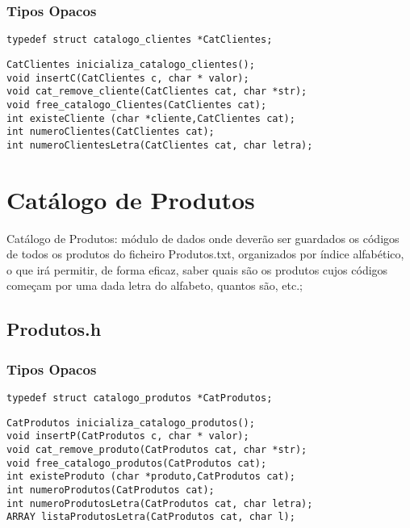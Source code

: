 \subsection{Tipos Opacos}

\begin{Verbatim}
typedef struct catalogo_clientes *CatClientes;
\end{Verbatim}


\begin{Verbatim}
CatClientes inicializa_catalogo_clientes();
void insertC(CatClientes c, char * valor);
void cat_remove_cliente(CatClientes cat, char *str);
void free_catalogo_Clientes(CatClientes cat);
int existeCliente (char *cliente,CatClientes cat);
int numeroClientes(CatClientes cat);
int numeroClientesLetra(CatClientes cat, char letra);
\end{Verbatim}

\chapter{Catálogo de Produtos}


Catálogo de Produtos: módulo de dados onde deverão ser guardados os códigos de todos os produtos do ficheiro Produtos.txt, organizados por índice alfabético, o que irá permitir, de forma eficaz, saber quais são os produtos cujos códigos começam por uma dada letra do alfabeto, quantos são, etc.;



\section{Produtos.h}

\subsection{Tipos Opacos}
\begin{verbatim}
typedef struct catalogo_produtos *CatProdutos;
\end{verbatim}


\begin{Verbatim}
CatProdutos inicializa_catalogo_produtos();
void insertP(CatProdutos c, char * valor);
void cat_remove_produto(CatProdutos cat, char *str);
void free_catalogo_produtos(CatProdutos cat);
int existeProduto (char *produto,CatProdutos cat);
int numeroProdutos(CatProdutos cat);
int numeroProdutosLetra(CatProdutos cat, char letra);
ARRAY listaProdutosLetra(CatProdutos cat, char l);
\end{Verbatim}

